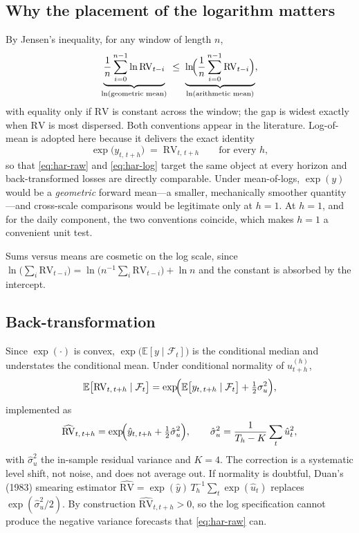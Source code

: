 \documentclass[11pt,a4paper]{article}
\newcommand{\RV}{\mathrm{RV}}
\newcommand{\E}{\mathbb{E}}
\newcommand{\Fset}{\mathcal{F}}
\begin{document}
\subsection{Why the placement of the logarithm matters}

By Jensen's inequality, for any window of length $n$,
\begin{equation}
  \underbrace{\frac{1}{n}\sum_{i=0}^{n-1}\ln \RV_{t-i}}_{\ln(\text{geometric mean})}
  \;\le\;
  \underbrace{\ln\!\Bigl(\frac{1}{n}\sum_{i=0}^{n-1}\RV_{t-i}\Bigr)}_{\ln(\text{arithmetic mean})},
  \label{eq:jensen}
\end{equation}
with equality only if $\RV$ is constant across the window; the gap is widest exactly when
$\RV$ is most dispersed. Both conventions appear in the literature. Log-of-mean is adopted
here because it delivers the exact identity
\begin{equation}
  \exp\bigl(y_{t,\,t+h}\bigr)\;=\;\RV_{t,\,t+h}\qquad\text{for every }h,
  \label{eq:identity}
\end{equation}
so that \eqref{eq:har-raw} and \eqref{eq:har-log} target the same object at every horizon and
back-transformed losses are directly comparable. Under mean-of-logs, $\exp(y)$ would be a
\emph{geometric} forward mean---a smaller, mechanically smoother quantity---and cross-scale
comparisons would be legitimate only at $h=1$. At $h=1$, and for the daily component, the
two conventions coincide, which makes $h=1$ a convenient unit test.

Sums versus means are cosmetic on the log scale, since
$\ln\bigl(\sum_i \RV_{t-i}\bigr)=\ln\bigl(n^{-1}\sum_i \RV_{t-i}\bigr)+\ln n$ and the constant
is absorbed by the intercept.

\subsection{Back-transformation}

Since $\exp(\cdot)$ is convex, $\exp\bigl(\E[y\mid\Fset_t]\bigr)$ is the conditional median
and understates the conditional mean. Under conditional normality of $u^{(h)}_{t+h}$,
\begin{equation}
  \E\bigl[\RV_{t,\,t+h}\mid\Fset_t\bigr]
  =\exp\!\Bigl(\E\bigl[y_{t,\,t+h}\mid\Fset_t\bigr]+\tfrac{1}{2}\sigma_u^{2}\Bigr),
  \label{eq:jensen-correction}
\end{equation}
implemented as
\begin{equation}
  \widehat{\RV}_{t,\,t+h}
  =\exp\!\Bigl(\hat y_{t,\,t+h}+\tfrac{1}{2}\hat\sigma_u^{2}\Bigr),
  \qquad
  \hat\sigma_u^{2}=\frac{1}{T_h-K}\sum_{t}\hat u_t^{2},
  \label{eq:backtransform}
\end{equation}
with $\hat\sigma_u^{2}$ the in-sample residual variance and $K=4$. The correction is a
systematic level shift, not noise, and does not average out. If normality is doubtful,
Duan's (1983) smearing estimator
$\widehat{\RV}=\exp(\hat y)\,T_h^{-1}\sum_t\exp(\hat u_t)$ replaces $\exp(\hat\sigma_u^{2}/2)$.
By construction $\widehat{\RV}_{t,t+h}>0$, so the log specification cannot produce the
negative variance forecasts that \eqref{eq:har-raw} can.
\end{document}
